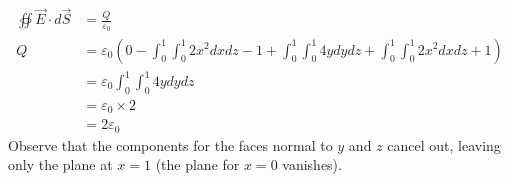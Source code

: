 \documentclass[answers]{exam}
\begin{document}
\begin{questions}
\begin{solution}
	\begin{align*}
		\oiint \vec{E}\cdot d\vec{S} &= \frac{Q}{\varepsilon_0} \\
		Q &= \varepsilon_0\left(0 - \int_0^1\int_0^1 2x^2 dxdz - 1 + \int_0^1\int_0^1 4ydydz + \int_0^1\int_0^1 2x^2 dxdz + 1\right) \\
		  &= \varepsilon_0\int_0^1\int_0^1 4ydydz \\
		  &= \varepsilon_0\times2 \\
		  &= 2\varepsilon_0
	\end{align*}
	Observe that the components for the faces normal to $y$ and $z$ cancel out, leaving only the plane at $x=1$ (the plane for $x=0$ vanishes).
\end{solution}

\end{questions}
\end{document}
